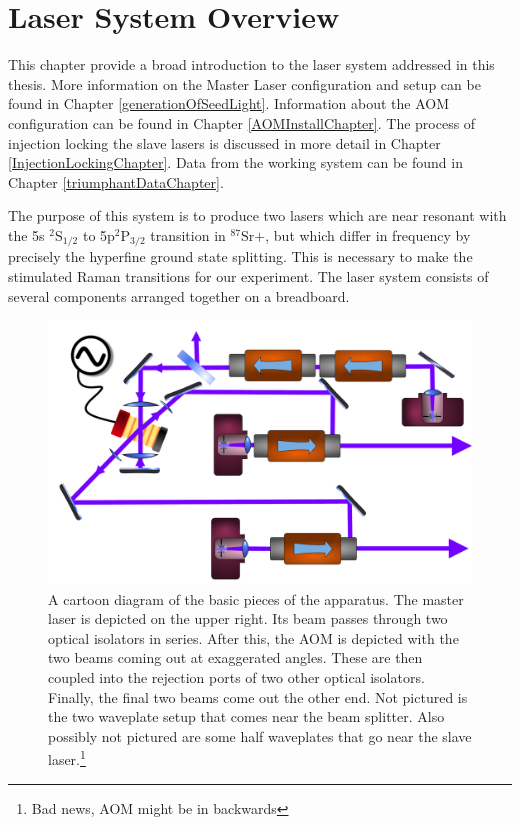 \chapter{Laser System Overview}

This chapter provide a broad introduction to the laser system addressed in this thesis. More information on the Master Laser configuration and setup can be found in Chapter \ref{generationOfSeedLight}. Information about the AOM configuration can be found in Chapter \ref{AOMInstallChapter}. The process of injection locking the slave lasers is discussed in more detail in Chapter \ref{InjectionLockingChapter}. Data from the working system can be found in Chapter \ref{triumphantDataChapter}.

The purpose of this system is to produce two lasers which are near resonant with the 5s $^2$S$_{1/2}$ to 5p$^2$P$_{3/2}$ transition in $^{87}$Sr$+$, but which differ in frequency by precisely the hyperfine ground state splitting. This is necessary to make the stimulated Raman transitions for our experiment. The laser system consists of several components arranged together on a breadboard. 

\begin{figure}
    \centerline{\includegraphics[width=1\textwidth]{diagramOfSetup3}}
    \caption[Diagram of the Setup]{\label{figdiagramOfSetup}
	A cartoon diagram of the basic pieces of the apparatus. The master laser is depicted on the upper right. Its beam passes through two optical isolators in series. After this, the AOM is depicted with the two beams coming out at exaggerated angles. These are then coupled into the rejection ports of two other optical isolators. Finally, the final two beams come out the other end. Not pictured is the two waveplate setup that comes near the beam splitter. Also possibly not pictured are some half waveplates that go near the slave laser.\footnote{Bad news, AOM might be in backwards} 
    }
\end{figure}


